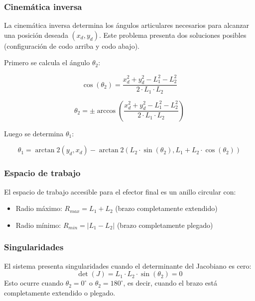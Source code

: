 \subsubsection{Cinemática inversa}
La cinemática inversa determina los ángulos articulares necesarios para alcanzar una posición deseada $(x_d, y_d)$. Este problema presenta dos soluciones posibles (configuración de codo arriba y codo abajo).

Primero se calcula el ángulo $\theta_2$:

\noindent
\begin{minipage}{0.48\textwidth}
\begin{equation}
\cos(\theta_2) = \frac{x_d^2 + y_d^2 - L_1^2 - L_2^2}{2 \cdot L_1 \cdot L_2}
\end{equation}
\end{minipage}
\hfill
\begin{minipage}{0.48\textwidth}
\begin{equation}
\theta_2 = \pm \arccos\left(\frac{x_d^2 + y_d^2 - L_1^2 - L_2^2}{2 \cdot L_1 \cdot L_2}\right)
\end{equation}
\end{minipage}
Luego se determina $\theta_1$:

\begin{equation}
\theta_1 = \arctan2(y_d, x_d) - \arctan2(L_2 \cdot \sin(\theta_2), L_1 + L_2 \cdot \cos(\theta_2))
\end{equation}
\subsubsection{Espacio de trabajo}
El espacio de trabajo accesible para el efector final es un anillo circular con:
\begin{itemize}
    \item Radio máximo: $R_{max} = L_1 + L_2$ (brazo completamente extendido)
    \item Radio mínimo: $R_{min} = |L_1 - L_2|$ (brazo completamente plegado)
\end{itemize}

\subsubsection{Singularidades}
El sistema presenta singularidades cuando el determinante del Jacobiano es cero:
\begin{equation}
\det(J) = L_1 \cdot L_2 \cdot \sin(\theta_2) = 0
\end{equation}
Esto ocurre cuando $\theta_2 = 0^\circ$ o $\theta_2 = 180^\circ$, es decir, cuando el brazo está completamente extendido o plegado.